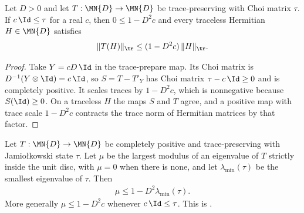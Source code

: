 \begin{theorem}
    \label{thm:scalar_choi_traceless_contraction}
    \leanok
    Let $D>0$ and let $T:\MN{D}\to\MN{D}$ be trace-preserving with Choi
    matrix $\tau$. If $c\,\Id\le\tau$ for a real $c$, then
    $0\le1-D^2c$ and every traceless Hermitian $H\in\MN{D}$ satisfies
    \begin{align}
        \lVert T(H)\rVert_{\tr}\le(1-D^2c)\,\lVert H\rVert_{\tr}.
    \end{align}
\end{theorem}

\begin{proof}\leanok
    Take $Y=cD\,\Id$ in the trace-prepare map. Its Choi matrix is
    $D^{-1}(Y\otimes\Id)=c\,\Id$, so $S=T-T'_Y$ has Choi matrix
    $\tau-c\,\Id\ge0$ and is completely positive. It scales traces by
    $1-D^2c$, which is nonnegative because $S(\Id)\ge0$. On a traceless $H$
    the maps $S$ and $T$ agree, and a positive map with trace scale
    $1-D^2c$ contracts the trace norm of Hermitian matrices by that factor.
\end{proof}

\begin{corollary}
    \label{cor:channel_spectrum_jamiolkowski}
    \leanok
    Let $T:\MN{D}\to\MN{D}$ be completely positive and trace-preserving
    with Jamio{\l}kowski state $\tau$. Let $\mu$ be the largest modulus of
    an eigenvalue of $T$ strictly inside the unit disc, with $\mu=0$ when
    there is none, and let $\lambda_{\min}(\tau)$ be the smallest eigenvalue
    of $\tau$. Then
    \begin{align}
        \mu\le1-D^2\lambda_{\min}(\tau).
    \end{align}
    More generally $\mu\le1-D^2c$ whenever $c\,\Id\le\tau$.
    This is \cite[Chapter~8, Equation~(8.87)]{Wolf2012Quantum}.
\end{corollary}

